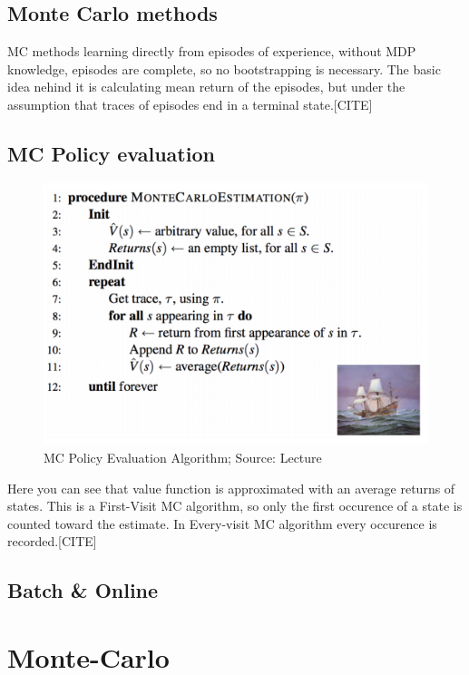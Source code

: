 \subsection{Monte Carlo methods}

MC methods learning directly from episodes of experience,
without MDP knowledge, episodes are complete, so no bootstrapping is necessary. The basic idea nehind it is calculating mean return of the episodes, but under the assumption that traces of episodes end in a terminal state.[CITE]

\subsection{MC Policy evaluation}

\begin{figure}[h!]
  \centering
  \includegraphics[scale=0.5]{figures/mc_policy_evaluation.PNG}
  \caption{MC Policy Evaluation Algorithm; Source: Lecture}
  \label{fig:via}
\end{figure}

Here you can see that value function is approximated with an average returns of states. This is a First-Visit MC algorithm, so only the first occurence of a state is counted toward the estimate. In Every-visit MC algorithm every occurence is recorded.[CITE]



\subsection{Batch & Online}


\section{Monte-Carlo}
